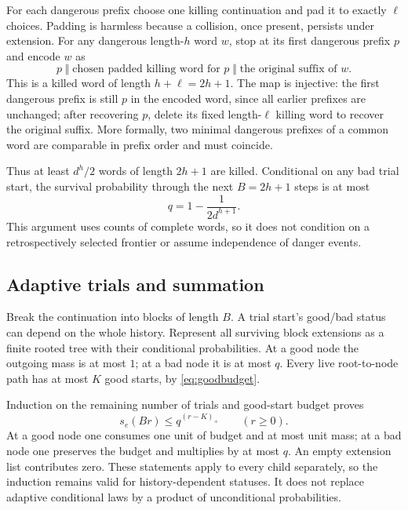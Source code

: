 \documentclass[11pt]{article}
\theoremstyle{definition}
\begin{document}
For each dangerous prefix choose one killing continuation and pad it to
exactly $\ell$ choices. Padding is harmless because a collision, once
present, persists under extension. For any dangerous length-$h$ word $w$,
stop at its first dangerous prefix $p$ and encode $w$ as
\[
 p\;\Vert\;\text{chosen padded killing word for }p\;\Vert\;
 \text{the original suffix of }w.
\]
This is a killed word of length $h+\ell=2h+1$. The map is injective:
the first dangerous prefix is still $p$ in the encoded word, since all
earlier prefixes are unchanged; after recovering $p$, delete its fixed
length-$\ell$ killing word to recover the original suffix. More formally,
two minimal dangerous prefixes of a common word are comparable in prefix
order and must coincide.

Thus at least $d^h/2$ words of length $2h+1$ are killed. Conditional on
any bad trial start, the survival probability through the next
$B=2h+1$ steps is at most
\begin{equation}\label{eq:q}
 q=1-\frac{1}{2d^{h+1}}.
\end{equation}
This argument uses counts of complete words, so it does not condition on
a retrospectively selected frontier or assume independence of danger events.

\subsection{Adaptive trials and summation}

Break the continuation into blocks of length $B$. A trial start's good/bad
status can depend on the whole history. Represent all surviving block
extensions as a finite rooted tree with their conditional probabilities.
At a good node the outgoing mass is at most $1$; at a bad node it is
at most $q$. Every live root-to-node path has at most $K$ good starts,
by \eqref{eq:goodbudget}.

Induction on the remaining number of trials and good-start budget proves
\begin{equation}\label{eq:tail}
 s_e(Br)\le q^{(r-K)_+}\qquad(r\ge0).
\end{equation}
At a good node one consumes one unit of budget and at most unit mass;
at a bad node one preserves the budget and multiplies by at most $q$.
An empty extension list contributes zero. These statements apply to every
child separately, so the induction remains valid for history-dependent
statuses. It does not replace adaptive conditional laws by a product of
unconditional probabilities.
\end{document}
